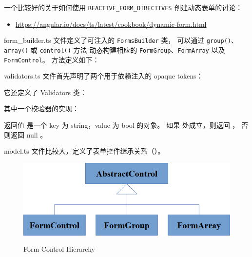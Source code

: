 一个比较好的关于如何使用 \texttt{REACTIVE\_FORM\_DIRECTIVES} 创建动态表单的讨论：

\begin{itemize}
  \item \url{https://angular.io/docs/ts/latest/cookbook/dynamic-form.html}
\end{itemize}


form\_builder.ts 文件定义了可注入的 \texttt{FormsBuilder} 类，
可以通过 \texttt{group()}、\texttt{array()} 或 \texttt{control()} 方法
动态构建相应的 \texttt{FormGroup}、\texttt{FormArray} 以及 \texttt{FormControl}。
方法定义如下：




validators.ts 文件首先声明了两个用于依赖注入的 opaque tokens：




它还定义了 Validators 类：




其中一个校验器的实现：




返回值  是一个 key 为 string，value 为 bool 的对象。
如果  处成立，则返回  ，
否则返回 null 。


model.ts 文件比较大，定义了表单控件继承关系（）。

\begin{figure}[!hbt]
  \centering
  \caption{Form Control Hierarchy}
  \includegraphics[width=0.75\linewidth]{15_the_forms_package/form_control_hierarchy}
  \label{fig:form_control_hierarchy}
\end{figure}

